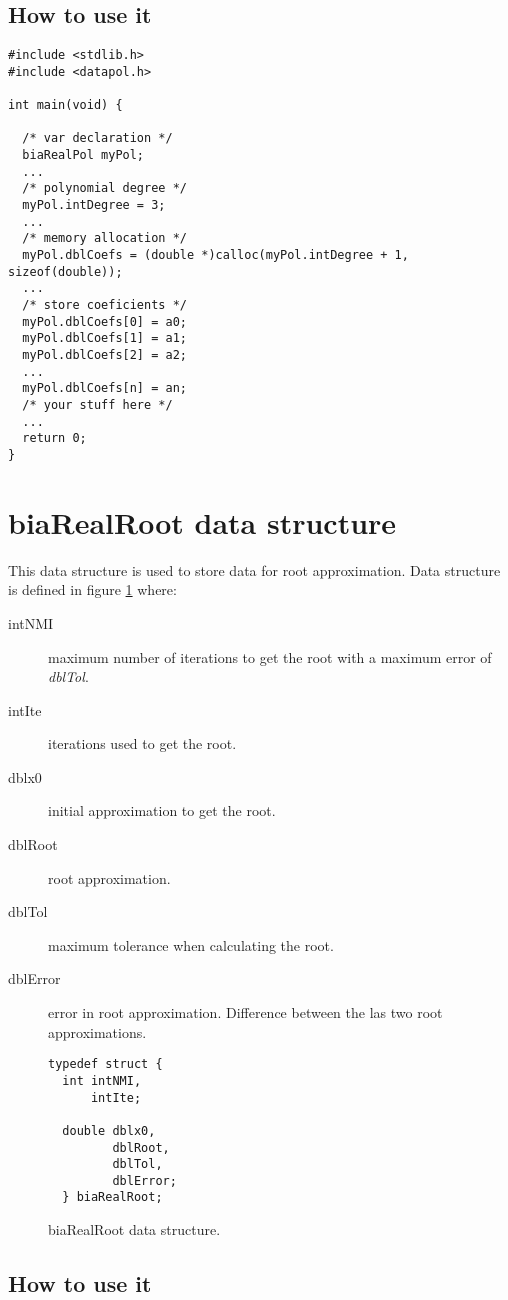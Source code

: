 \subsection{How to use it}

%
\begin{verbatim}
#include <stdlib.h>
#include <datapol.h>

int main(void) {

  /* var declaration */
  biaRealPol myPol;
  ...
  /* polynomial degree */
  myPol.intDegree = 3;  
  ...
  /* memory allocation */
  myPol.dblCoefs = (double *)calloc(myPol.intDegree + 1, sizeof(double));  
  ...
  /* store coeficients */
  myPol.dblCoefs[0] = a0;
  myPol.dblCoefs[1] = a1;
  myPol.dblCoefs[2] = a2;
  ...
  myPol.dblCoefs[n] = an;
  /* your stuff here */
  ...
  return 0;
}
\end{verbatim}



\section{\textbf{biaRealRoot} data structure} \label{sec:biaRealRoot}

This data structure is used to store data for root approximation. Data structure is defined in figure \ref{fig:biaRealRoot} where:

\begin{description}
\item[intNMI] maximum number of iterations to get the root with a maximum error of \emph{dblTol}.
\item[intIte] iterations used to get the root.
\item[dblx0] initial approximation to get the root.
\item[dblRoot] root approximation.
\item[dblTol] maximum tolerance when calculating the root.
\item[dblError] error in root approximation. Difference between the las two root approximations.
\end{description}

\begin{figure}[!h]
\begin{verbatim}
typedef struct {
  int intNMI,
      intIte;

  double dblx0,
         dblRoot,
         dblTol,
         dblError;
  } biaRealRoot;
\end{verbatim}
\caption{biaRealRoot data structure.} \label{fig:biaRealRoot}
\end{figure}

\FloatBarrier

\subsection{How to use it}

